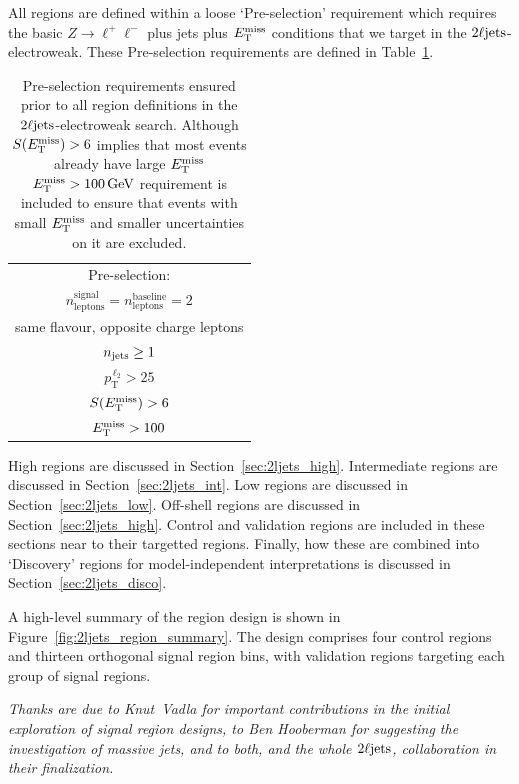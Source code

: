 All regions are defined within a loose `Pre-selection' requirement which
requires the basic $Z\rightarrow \ell^+\ell^-$ plus jets plus $\met$
conditions that we target in the $\twoljets$-electroweak.
These Pre-selection requirements are defined in Table~\ref{tab:2ljets_presel}.

\begin{table}[tp]
\centering
\begin{tabular}{c}
Pre-selection:
\\[1em]
$n_\mathrm{leptons}^\mathrm{signal} = n_\mathrm{leptons}^\mathrm{baseline} = 2$
\\[0.5em]
same flavour, opposite charge leptons
\\[0.5em]
$\njet \geq 1$
\\[0.5em]
$p_\mathrm{T}^{\,\ell_2} > 25$
\\[0.5em]
$\metsig > 6$
\\[0.5em]
$\met > 100$
\end{tabular}
\caption[%
Pre-selection requirements ensured prior to all region definitions in the
$\twoljets$-electroweak search
]{%
Pre-selection requirements ensured prior to all region definitions in the
$\twoljets$-electroweak search.
Although $\metsig > 6$ implies that most events already have large $\met$
$\met > 100\,\eV[G]$ requirement is included to ensure that events with small
$\met$ and smaller uncertainties on it are excluded.
}
\label{tab:2ljets_presel}
\end{table}

High regions are discussed in Section~\ref{sec:2ljets_high}.
Intermediate regions are discussed in Section~\ref{sec:2ljets_int}.
Low regions are discussed in Section~\ref{sec:2ljets_low}.
Off-shell regions are discussed in Section~\ref{sec:2ljets_high}.
Control and validation regions are included in these sections near to their
targetted regions.
Finally, how these are combined into `Discovery' regions for
model-independent interpretations is discussed in
Section~\ref{sec:2ljets_disco}.

A high-level summary of the region design is shown in
Figure~\ref{fig:2ljets_region_summary}.
The design comprises four control regions and thirteen orthogonal signal region
bins, with validation regions targeting each group of signal regions.

\emph{%
Thanks are due to Knut~Vadla for important contributions in the initial
exploration of signal region designs,
to Ben Hooberman for suggesting the investigation of massive jets,
and to both, and the whole $\twoljets$, collaboration in their finalization.
}


